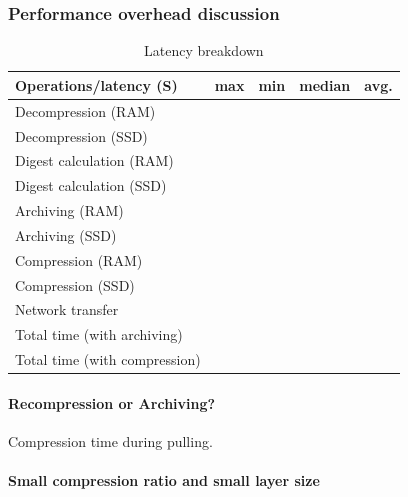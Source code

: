 \subsubsection{Performance overhead discussion}

\begin{table} 
	\centering 
	\scriptsize  
	\caption{Latency breakdown} \label{tbl:redundant_ratio} 
	\begin{tabular}{|l|l|l|l|l|}%
		\hline 
		Operations/latency (S) & max & min & median & avg.\\
		\hline
		 Decompression (RAM) &   &   &    &  \\
 		\hline
 		Decompression (SSD) &   &   &    &  \\
		\hline
		Digest calculation (RAM) &  &  & & \\
		\hline
		Digest calculation (SSD) &  &  & & \\
		\hline
		Archiving (RAM)  &  &  & &\\
		\hline
		Archiving (SSD) &  &  & & \\
		\hline
		Compression (RAM) & &  &  & \\
		\hline
		Compression (SSD) & &  &  & \\
		\hline
		Network transfer & & & & \\
		\hline 
		Total time (with archiving) & & & & \\
		\hline
		Total time (with compression) & & & & \\
		\hline 	
	\end{tabular} 
\end{table} 

\paragraph{Recompression or Archiving?} 

Compression time during pulling. 

\paragraph{Small compression ratio and small layer size}



